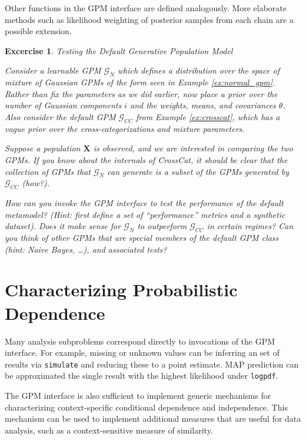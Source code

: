 \documentclass[10pt,letterpaper]{article}
\newtheorem{excercise}{Excercise}[section]
\begin{document}
Other functions in the GPM interface are defined analogously. More elaborate
methods such as likelihood weighting of posterior samples from each chain are a
possible extension.

\begin{excercise} \label{ex:normal_vs_normal} Testing the Default Generative
Population Model

    Consider a learnable GPM $\mathcal{G}_N$ which defines a distribution over
    the space of mixture of Gaussian GPMs of the form seen in Example
    \ref{ex:normal_gpm}. Rather than fix the parameters as we did earlier, now
    place a prior over the number of Gaussian components $i$ and the weights,
    means, and covariances $\theta$. Also consider the default GPM
    $\mathcal{G}_{CC}$ from Example \ref{ex:crosscat}, which has a vague prior
    over the cross-categorizations and mixture parameters.

    Suppose a population $\mathbf{X}$ is observed, and we are interested in
    comparing the two GPMs. If you know about the internals of CrossCat, it
    should be clear that the collection of GPMs that $\mathcal{G}_N$ can
    generate is a subset of the GPMs generated by $\mathcal{G}_{CC}$ (how?).

    How can you invoke the GPM interface to test the performance of the default
    metamodel? (Hint: first define a set of ``performance'' metrics and a
    synthetic dataset). Does it make sense for $\mathcal{G}_N$ to outperform
    $\mathcal{G}_{CC}$ in certain regimes? Can you think of other GPMs that are
    special members of the default GPM class (hint: Naive Bayes, \dots), and
    associated tests?
\end{excercise}

\section{Characterizing Probabilistic Dependence}

Many analysis subproblems correspond directly to invocations of the GPM
interface. For example, missing or unknown values can be inferring an set of
results via \texttt{simulate} and reducing these to a point estimate. MAP
prediction can be approximated the single result with the highest likelihood
under \texttt{logpdf}.

The GPM interface is also sufficient to implement generic mechanisms for
characterizing context-specific conditional dependence and independence. This
mechanism can be used to implement additional measures that are useful for data
analysis, such as a context-sensitive measure of similarity.
\end{document}
